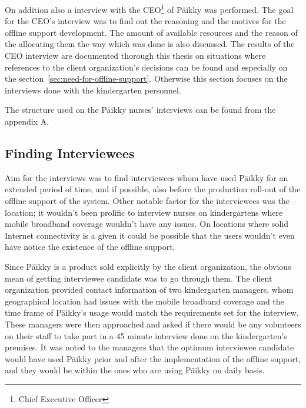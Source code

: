 On addition also a interview with the CEO\footnote{Chief Executive Officer} of Päikky was performed. The goal for the CEO's interview was to find out the reasoning and the motives for the offline support development. The amount of available resources and the reason of the allocating them the way which was done is also discussed. The results of the CEO interview are documented thorough this thesis on situations where references to the client organization's decisions can be found and especially on the section~\ref{sec:need-for-offline-support}. Otherwise this section focuses on the interviews done with the kindergarten personnel.

The structure used on the Päikky nurses' interviews can be found from the appendix A. %



\subsection{Finding Interviewees}

Aim for the interviews was to find interviewees whom have used Päikky for an extended period of time, and if possible, also before the production roll-out of the offline support of the system. Other notable factor for the interviewees was the location; it wouldn't been prolific to interview nurses on kindergartens where mobile broadband coverage wouldn't have any issues. On locations where solid Internet connectivity is a given it could be possible that the users wouldn't even have notice the existence of the offline support.

Since Päikky is a product sold explicitly by the client organization, the obvious mean of getting interviewee candidate was to go through them. The client organization provided contact information of two kindergarten managers, whom geographical location had issues with the mobile broadband coverage and the time frame of Päikky's usage would match the requirements set for the interview. These managers were then approached and asked if there would be any volunteers on their staff to take part in a 45 minute interview done on the kindergarten's premises. It was noted to the managers that the optimum interviewee candidate would have used Päikky prior and after the implementation of the offline support, and they would be within the ones who are using Päikky on daily basis.

